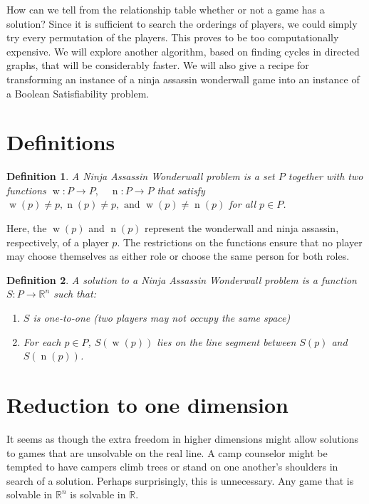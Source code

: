 \documentclass[12pt]{article}
\newtheorem*{definition}{Definition}
\DeclareMathOperator{\w}{w}
\DeclareMathOperator{\n}{n}
\begin{document}
    How can we tell from the relationship table whether or not a game has a solution? Since it is sufficient to search the orderings of players, we could simply try every permutation of the players. This proves to be too computationally expensive. We will explore another algorithm, based on finding cycles in directed graphs, that will be considerably faster. We will also give a recipe for transforming an instance of a ninja assassin wonderwall game into an instance of a Boolean Satisfiability problem.


\section{Definitions}

    \begin{definition}
    A \emph{Ninja Assassin Wonderwall problem} is a set $P$ together with two functions $\w:P\to P, \quad \n: P\to P$ that satisfy $\w(p) \neq p, \n(p) \neq p, \text{ and } \w(p) \neq \n(p)$ for all $p \in P$.
    \end{definition}

    Here, the $\w(p)$ and $\n(p)$ represent the wonderwall and ninja assassin, respectively, of a player $p$. The restrictions on the functions ensure that no player may choose themselves as either role or choose the same person for both roles. 


    \begin{definition}
    A \emph{solution} to a Ninja Assassin Wonderwall problem is a function $S: P\to \mathbb{R}^{n}$ such that:
        \begin{enumerate}
        \item $S$ is one-to-one (two players may not occupy the same space)
        \item For each $p \in P$, $S(\w(p))$ lies on the line segment between $S(p)$ and $S(\n(p))$.
        \end{enumerate}
    \end{definition}


\section{Reduction to one dimension}

    It seems as though the extra freedom in higher dimensions might allow solutions to games that are unsolvable on the real line. A camp counselor might be tempted to have campers climb trees or stand on one another's shoulders in search of a solution. Perhaps surprisingly, this is unnecessary. Any game that is solvable in $\mathbb{R}^n$ is solvable in $\mathbb{R}$.
\end{document}
